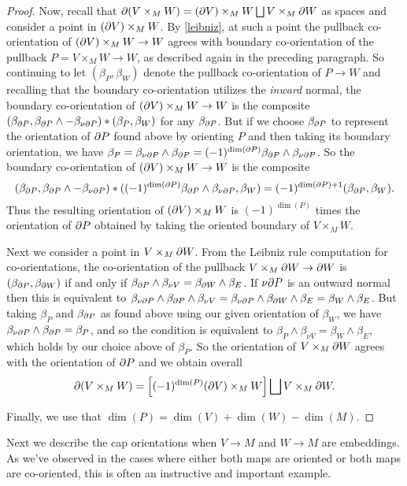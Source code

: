 \begin{proof}
Now, recall that $\partial(V\times_MW)=(\partial V)\times_M W \bigsqcup V\times_M\partial W$ as spaces and consider a point in $(\partial V)\times_M W$. By \cref{leibniz}, at such a point the pullback co-orientation of $(\partial V)\times_M W\to W$ agrees with boundary co-orientation of the pullback $P=V\times_M W\to W$, as described again in the preceding paragraph. So continuing to let  $(\beta_P,\beta_W)$ denote the pullback co-orientation of $P\to W$ and recalling that the boundary co-orientation utilizes the \textit{inward} normal, the boundary co-orientation of $(\partial V)\times_M W\to W$ is  the composite $(\beta_{\partial P}, \beta_{\partial P}\wedge -\beta_{\nu\partial P})*(\beta_P,\beta_W)$ for any $\beta_{\partial P}$. But if we choose $\beta_{\partial P}$ to represent the orientation of $\partial P$ found above by orienting $P$ and then taking its boundary orientation, we have $\beta_P=\beta_{\nu\partial P}\wedge \beta_{\partial P}=(-1)^{\dim(\partial P)}\beta_{\partial P}\wedge \beta_{\nu\partial P}$. So the boundary co-orientation of $(\partial V)\times_M W\to W$ is the composite
 $$(\beta_{\partial P}, \beta_{\partial P}\wedge -\beta_{\nu\partial P})*((-1)^{\dim(\partial P)}\beta_{\partial P}\wedge \beta_{\nu\partial P},\beta_W)=(-1)^{\dim(\partial P)+1}(\beta_{\partial P},\beta_W).$$
Thus the resulting orientation of $(\partial V)\times_M W$ is $(-1)^{\dim(P)}$ times the orientation of $\partial P$ obtained by taking the oriented boundary of $V\times_M W$.

Next we consider a point in $V\times_M\partial W$. From the Leibniz rule computation for co-orientations,  the co-orientation of the pullback $V\times_M\partial W\to \partial W$ is $(\beta_{\partial P},\beta_{\partial W})$ if and only if  $\beta_{\partial P}\wedge \beta_{\nu V}=\beta_{\partial W}\wedge \beta_E$. If $\nu\partial P$ is an outward normal then this is equivalent to $\beta_{\nu\partial P}\wedge \beta_{\partial P}\wedge \beta_{\nu V}=\beta_{\nu\partial P}\wedge \beta_{\partial W}\wedge \beta_E= \beta_W\wedge \beta_E$. But taking $\beta_P$ and $\beta_{\partial P}$ as found above using our given orientation of $\beta_W$, we have $\beta_{\nu\partial P}\wedge \beta_{\partial P}=\beta_P$, and so the condition is equivalent to $\beta_{P}\wedge \beta_{\nu V}= \beta_W\wedge \beta_E$, which holds by our choice above of $\beta_P$. So the orientation of $V\times_M\partial W$ agrees with the orientation of $\partial P$ and we obtain overall $$\partial(V\times_MW)=\left[(-1)^{\dim(P)} (\partial V)\times_M W\right] \bigsqcup V\times_M\partial W.$$

Finally, we use that $\dim(P)=\dim(V)+\dim(W)-\dim(M)$.
\end{proof}




Next we describe the cap orientations when $V\to M$ and $W \to M$ are embeddings.  As we've observed in the cases where either both maps are oriented or both maps are co-oriented, this is often an instructive  and important example.

